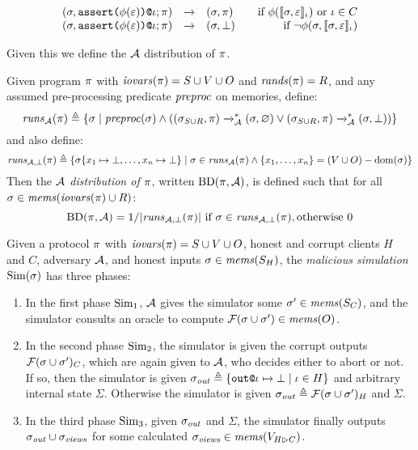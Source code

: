 $$
\begin{array}{rcl@{\qquad}r}
  (\store,\elab{\assert{\phi(\be)}}{\cid};\prog) &\redx& (\store,\prog) & \text{if\ } \phi(\lcod{\store,\be}{\cid}) \text{\ or\ } \cid \in C\\
  (\store,\elab{\assert{\phi(\be)}}{\cid};\prog) &\redx& (\store,\bot)  & \text{if\ } \neg\phi(\store,\lcod{\store,\be}{\cid})
\end{array}
$$

Given this we define the $\mathcal{A}$ distribution of $\pi$. 
\begin{definition}
  \label{def-progd}
  \label{definition-progd}
  Given program $\pi$ with $\mathit{iovars}(\pi) = S \cup V \cup O$ and $\mathit{rands}(\pi) = R$, and
  any assumed pre-processing predicate $\mathit{preproc}$ on memories, define:
  $$
  \mathit{runs}_{\mathcal{A}}(\pi) \triangleq \{ \sigma \mid \mathit{preproc}(\sigma)  \wedge
  ((\sigma_{S\cup R},\pi) \xrightarrow{}_{\mathcal{A}}^* (\sigma,\varnothing) \vee (\sigma_{S \cup R},\pi) \xrightarrow{}_{\mathcal{A}}^* (\sigma,\bot)) \}
  $$
  and also define:
  $$
  \mathit{runs}_{\mathcal{A},\bot}(\pi) \triangleq \{ \sigma\{ x_1 \mapsto \bot, \ldots, x_n \mapsto \bot \} \mid
  \sigma \in \mathit{runs}_{\mathcal{A}}(\pi) \wedge \{ x_1,\ldots,x_n\} = (V \cup O) - \mathrm{dom}(\sigma) \}
  $$
  Then the \emph{$\mathcal{A}$ distribution of $\pi$}, written $\mathrm{BD}(\pi,\mathcal{A})$, is
  defined such that for all $\sigma \in \mathit{mems}(\mathit{iovars}(\pi) \cup R)$:
  $$
  \mathrm{BD}(\pi,\mathcal{A}) =  1 / |\mathit{runs}_{\mathcal{A},\bot}(\pi)| \ \text{if}\ \sigma \in \mathit{runs}_{\mathcal{A},\bot}(\pi), \text{otherwise}\ 0
  $$
\end{definition}

\begin{definition}
  Given a protocol $\pi$ with $\mathit{iovars}(\pi) = S \cup V \cup O$, honest and corrupt 
  clients $H$ and $C$, adversary $\mathcal{A}$, and honest inputs
  $\sigma \in \mathit{mems}(S_H)$, the \emph{malicious simulation}  $\mathrm{Sim}(\sigma)$ has three phases:
  \begin{enumerate}
  \item In the first phase $\mathrm{Sim}_1$, $\mathcal{A}$ gives the
    simulator some $\sigma' \in \mathit{mems}(S_C)$, and the simulator consults an
    oracle to compute $\mathcal{F}(\sigma \cup \sigma') \in \mathit{mems}(O)$.
  \item In the second phase $\mathrm{Sim}_2$, the simulator is given the corrupt
    outputs $\mathcal{F}(\sigma \cup \sigma')_C$, which are again given to
    $\mathcal{A}$, who decides either to abort or not. If so, then the
    simulator is given $\sigma_{\mathit{out}} \triangleq \{ \texttt{out}\texttt{@}\iota \mapsto \bot \mid \iota \in H \}$
    and arbitrary internal state $\Sigma$.
    Otherwise the simulator is given $\sigma_{\mathit{out}} \triangleq \mathcal{F}(\sigma \cup \sigma')_H$
    and $\Sigma$.
  \item In the third phase $\mathrm{Sim}_3$, given $\sigma_{\mathit{out}}$ and $\Sigma$, the simulator
    finally outputs
    $\sigma_{\mathit{out}} \cup \sigma_{\mathit{views}}$ for some
    calculated $\sigma_{\mathit{views}} \in \mathit{mems}(V_{H \rhd C})$.
  \end{enumerate}
\end{definition}

